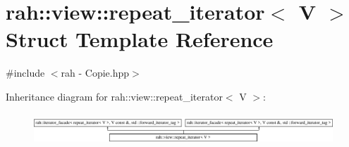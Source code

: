 \hypertarget{structrah_1_1view_1_1repeat__iterator}{}\section{rah\+::view\+::repeat\+\_\+iterator$<$ V $>$ Struct Template Reference}
\label{structrah_1_1view_1_1repeat__iterator}


{\ttfamily \#include $<$rah -\/ Copie.\+hpp$>$}

Inheritance diagram for rah\+::view\+::repeat\+\_\+iterator$<$ V $>$\+:\begin{figure}[H]
\begin{center}
\leavevmode
\includegraphics[height=1.145194cm]{structrah_1_1view_1_1repeat__iterator}
\end{center}
\end{figure}
